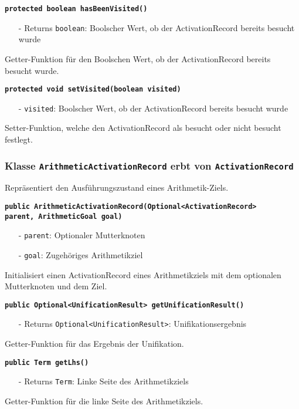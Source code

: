 \documentclass[parskip=full,11pt,twoside]{scrartcl}
\begin{document}
\textbf{\texttt{protected boolean hasBeenVisited()}}
\begin{itemize}[noitemsep]
	\item[-] Returns \texttt{boolean}: Boolscher Wert, ob der ActivationRecord bereits besucht wurde
\end{itemize}
Getter-Funktion für den Boolschen Wert, ob der ActivationRecord bereits besucht wurde.

\textbf{\texttt{protected void setVisited(boolean visited)}}
\begin{itemize}[noitemsep]
	\item[-] \texttt{visited}: Boolscher Wert, ob der ActivationRecord bereits besucht wurde
\end{itemize}
Setter-Funktion, welche den ActivationRecord als besucht oder nicht besucht festlegt.

\subsubsection{Klasse \texttt{ArithmeticActivationRecord} erbt von \texttt{ActivationRecord}}
Repräsentiert den Ausführungszustand eines Arithmetik-Ziels.

\textbf{\texttt{public ArithmeticActivationRecord(Optional<ActivationRecord>\\parent, ArithmeticGoal goal)}}
\begin{itemize}[noitemsep]
	\item[-] \texttt{parent}: Optionaler Mutterknoten
	\item[-] \texttt{goal}: Zugehöriges Arithmetikziel
\end{itemize}
Initialisiert einen ActivationRecord eines Arithmetikziels mit dem optionalen Mutterknoten und dem Ziel.

\textbf{\texttt{public Optional<UnificationResult> getUnificationResult()}}
\begin{itemize}[noitemsep]
	\item[-] Returns \texttt{Optional<UnificationResult>}: Unifikationsergebnis
\end{itemize}
Getter-Funktion für das Ergebnis der Unifikation.

\textbf{\texttt{public Term getLhs()}}
\begin{itemize}[noitemsep]
	\item[-] Returns \texttt{Term}: Linke Seite des Arithmetikziels
\end{itemize}
Getter-Funktion für die linke Seite des Arithmetikziels.
\end{document}
